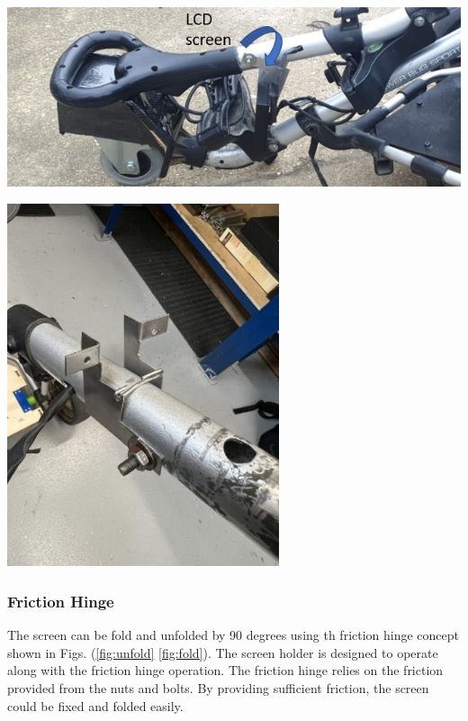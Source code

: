 \documentclass[11pt,landscape]{article}
\newenvironment{Figure}
  {\par\medskip\noindent\minipage{\linewidth}}
  {\endminipage\par\medskip}
\begin{document}
\begin{multicols}{3}
    \begin{Figure}
        \begin{center}
            \includegraphics[width=\textwidth]{Figure39.jpg}
            \label{fig:holder}
        \end{center}
    \end{Figure}
    
    \begin{Figure}
        \begin{center}
            \includegraphics[width=0.6\textwidth]{Figure31.jpg}
            \label{fig:rod}
        \end{center}
    \end{Figure}
    
    \subsubsection{Friction Hinge}
    The screen can be fold and unfolded by 90 degrees using th friction hinge
    concept shown in Figs. (\ref{fig:unfold} \ref{fig:fold}). The screen
    holder is designed to operate along with the friction hinge operation. The
    friction hinge relies on the friction provided from the nuts and bolts. By
    providing sufficient friction, the screen could be fixed and folded easily.
    

\end{multicols}
\end{document}
